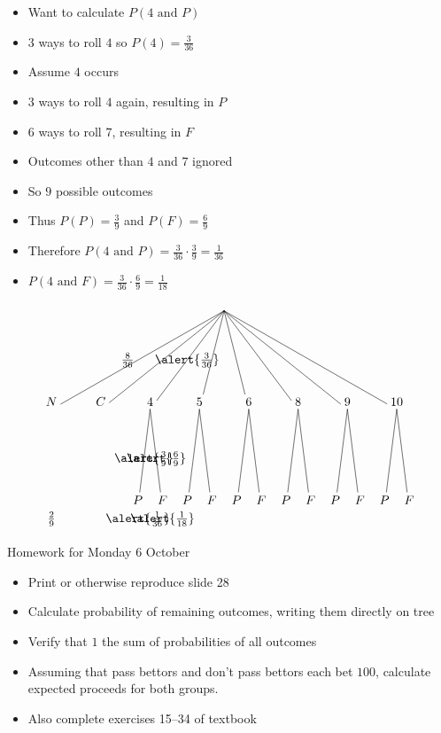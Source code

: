 \documentclass{beamer}
\theoremstyle{definition}
\begin{document}
\begin{frame}
\begin{itemize}
\item Want to calculate $P\left(\text{$4$ and $P$}\right)$
\item $3$ ways to roll $4$ so $P\left(4\right)=\frac{3}{36}$
\item Assume $4$ occurs
\item $3$ ways to roll $4$ again, resulting in $P$
\item $6$ ways to roll $7$, resulting in $F$
\item Outcomes other than $4$ and $7$ ignored
\item So $9$ possible outcomes
\item Thus $P\left(P\right)=\frac{3}{9}$
and $P\left(F\right)=\frac{6}{9}$
\item Therefore
$P\left(\text{$4$ and $P$}\right)
=\frac{3}{36}\cdot\frac{3}{9}=\frac{1}{36}$
\item $P\left(\text{$4$ and $F$}\right)
=\frac{3}{36}\cdot\frac{6}{9}=\frac{1}{18}$
\end{itemize}
\end{frame}

\begin{frame}
\[\begin{xy}<1.4cm,0cm>:
(4.5,0)="0";
(1,-2)="N";(2,-2)="C";(3,-2)="4";(4,-2)="5";
(5,-2)="6";(6,-2)="8";(7,-2)="9";(8,-2)="10";
"0";"N"*+!D{N}**\dir{-}?*+!R{\frac{8}{36}};
"0";"C"*+!D{C}**\dir{-};
"0";"4"*+!D{4}**\dir{-}?*{\alert{\frac{3}{36}}};
"0";"5"*+!D{5}**\dir{-};
"0";"6"*+!D{6}**\dir{-};
"0";"8"*+!D{8}**\dir{-};
"0";"9"*+!D{9}**\dir{-};
"0";"10"*+!D{10}**\dir{-};
"4";(2.75,-4)*+!D{P}**\dir{-}?*{\alert{\frac{3}{9}}};
"4";(3.25,-4)*+!D{F}**\dir{-}?*{\alert{\frac{6}{9}}};
"5";(3.75,-4)*+!D{P}**\dir{-};
"5";(4.25,-4)*+!D{F}**\dir{-};
"6";(4.75,-4)*+!D{P}**\dir{-};
"6";(5.25,-4)*+!D{F}**\dir{-};
"8";(5.75,-4)*+!D{P}**\dir{-};
"8";(6.25,-4)*+!D{F}**\dir{-};
"9";(6.75,-4)*+!D{P}**\dir{-};
"9";(7.25,-4)*+!D{F}**\dir{-};
"10";(7.75,-4)*+!D{P}**\dir{-};
"10";(8.25,-4)*+!D{F}**\dir{-};
(1,-4)*+!U{\frac{2}{9}};
(2.75,-4)*+!U{\alert{\frac{1}{36}}};
(3.25,-4)*+!U{\alert{\frac{1}{18}}};
\end{xy}\]
\end{frame}

\begin{frame}{Homework for Monday 6 October}
\begin{itemize}
\item Print or otherwise reproduce slide 28
\item Calculate probability of remaining outcomes,
writing them directly on tree
\item Verify that $1$ the sum of probabilities
of all outcomes
\item Assuming that pass bettors and
don't pass bettors each bet $100$,
calculate expected proceeds for both groups.
\item Also complete exercises 15--34 of textbook
\end{itemize}
\end{frame}
\end{document}
